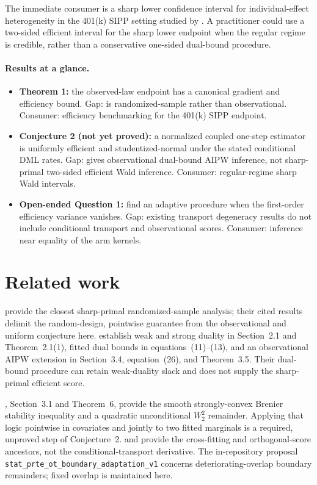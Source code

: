 \documentclass[11pt]{article}
\begin{document}
The immediate consumer is a sharp lower confidence interval for individual-effect heterogeneity in the 401(k) SIPP setting studied by \citet{ji2024modelagnostic}. A practitioner could use a two-sided efficient interval for the sharp lower endpoint when the regular regime is credible, rather than a conservative one-sided dual-bound procedure.

\paragraph{Results at a glance.}
\begin{itemize}[leftmargin=*]
\item \textbf{Theorem 1:} the observed-law endpoint has a canonical gradient and efficiency bound. Gap: \citet{lin2026statistical} is randomized-sample rather than observational. Consumer: efficiency benchmarking for the 401(k) SIPP endpoint.
\item \textbf{Conjecture 2 (not yet proved):} a normalized coupled one-step estimator is uniformly efficient and studentized-normal under the stated conditional DML rates. Gap: \citet{ji2024modelagnostic} gives observational dual-bound AIPW inference, not sharp-primal two-sided efficient Wald inference. Consumer: regular-regime sharp Wald intervals.
\item \textbf{Open-ended Question 1:} find an adaptive procedure when the first-order efficiency variance vanishes. Gap: existing transport degeneracy results do not include conditional transport and observational scores. Consumer: inference near equality of the arm kernels.
\end{itemize}

\section{Related work}
\citet{lin2026statistical} provide the closest sharp-primal randomized-sample analysis; their cited results delimit the random-design, pointwise guarantee from the observational and uniform conjecture here. \citet{ji2024modelagnostic} establish weak and strong duality in Section~2.1 and Theorem~2.1(1), fitted dual bounds in equations~(11)--(13), and an observational AIPW extension in Section~3.4, equation~(26), and Theorem~3.5. Their dual-bound procedure can retain weak-duality slack and does not supply the sharp-primal efficient score.

\citet{manole2024plugin}, Section~3.1 and Theorem~6, provide the smooth strongly-convex Brenier stability inequality and a quadratic unconditional \(W_2^2\) remainder. Applying that logic pointwise in covariates and jointly to two fitted marginals is a required, unproved step of Conjecture~2. \citet{chernozhukov2018double} and \citet{newey2018crossfitting} provide the cross-fitting and orthogonal-score ancestors, not the conditional-transport derivative. The in-repository proposal \texttt{stat\_prte\_ot\_boundary\_adaptation\_v1} concerns deteriorating-overlap boundary remainders; fixed overlap is maintained here.
\end{document}
